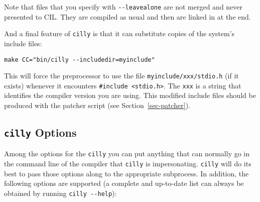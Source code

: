\documentclass{article}
\def\secref#1{Section~\ref{sec-#1}}
\def\t#1{{\tt #1}}
\begin{document}
 Note that files that you specify with \t{-{}-leavealone} are not merged and
never presented to CIL. They are compiled as usual and then are linked in at
the end. 

 And a final feature of \t{cilly} is that it can substitute copies of the
system's include files:

\begin{verbatim}
make CC="bin/cilly --includedir=myinclude"
\end{verbatim}

 This will force the preprocessor to use the file \t{myinclude/xxx/stdio.h}
(if it exists) whenever it encounters \t{\#include <stdio.h>}. The \t{xxx} is
a string that identifies the compiler version you are using. This modified
include files should be produced with the patcher script (see
\secref{patcher}).

  \subsection{\t{cilly} Options}

 Among the options for the \t{cilly} you can put anything that can normally
go in the command line of the compiler that \t{cilly} is impersonating.
\t{cilly} will do its best to pass those options along to the appropriate
subprocess. In addition, the following options are supported (a complete and
up-to-date list can always be obtained by running \t{cilly -{}-help}):
\end{document}
